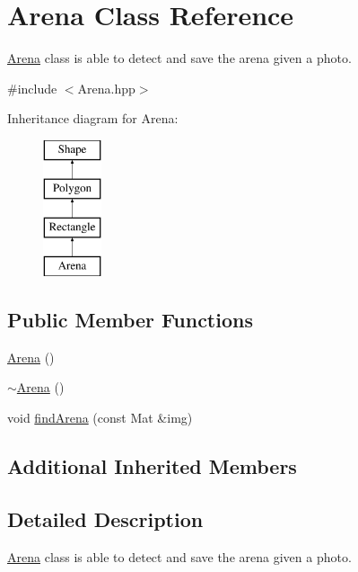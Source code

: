 \hypertarget{class_arena}{}\section{Arena Class Reference}
\label{class_arena}


\mbox{\hyperlink{class_arena}{Arena}} class is able to detect and save the arena given a photo.  




{\ttfamily \#include $<$Arena.\+hpp$>$}

Inheritance diagram for Arena\+:\begin{figure}[H]
\begin{center}
\leavevmode
\includegraphics[height=4.000000cm]{class_arena}
\end{center}
\end{figure}
\subsection*{Public Member Functions}
\begin{DoxyCompactItemize}
\item 
\mbox{\hyperlink{class_arena_a74f105bc709d4728fb07f1984abfd345}{Arena}} ()
\item 
\mbox{\hyperlink{class_arena_ae21b399e9e3f6b8ac4ecc44d7d1667fc}{$\sim$\+Arena}} ()
\item 
void \mbox{\hyperlink{class_arena_aa37acdf43108ab0da04b77bbf79c2f7d}{find\+Arena}} (const Mat \&img)
\end{DoxyCompactItemize}
\subsection*{Additional Inherited Members}


\subsection{Detailed Description}
\mbox{\hyperlink{class_arena}{Arena}} class is able to detect and save the arena given a photo. 

